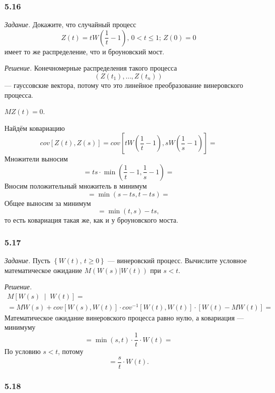 \subsubsection*{5.16}

\textit{Задание.}
Докажите, что случайный процесс
$$Z \left( t \right) = tW \left( \frac{1}{t} - 1 \right), \,
  0 < t \leq 1; \,
  Z \left( 0 \right) = 0$$
имеет то же распределение, что и броуновский мост.

\textit{Решение.}
Конечномерные распределения такого процесса
$$ \left( Z \left( t_1 \right), \dotsc, Z \left( t_n \right) \right) $$
--- гауссовские вектора,
потому что это линейное преобразование винеровского процесса.

$MZ \left( t \right) =
  0$.

Найдём ковариацию
$$cov \left[ Z \left( t \right), Z \left( s \right) \right] =
  cov \left[ tW \left( \frac{1}{t} - 1 \right), sW \left( \frac{1}{s} - 1 \right) \right] =$$
Множители выносим
$$= ts \cdot \min \left( \frac{1}{t} - 1, \frac{1}{s} - 1 \right) =$$
Вносим положительный множитель в минимум
$$= \min \left( s - ts, t - ts \right) =$$
Общее выносим за минимум
$$= \min \left( t, s \right) - ts,$$
то есть ковариация такая же, как и у броуновского моста.


\subsubsection*{5.17}

\textit{Задание.}
Пусть $ \left\{ W \left( t \right), \, t \geq 0 \right\} $ --- винеровский процесс.
Вычислите условное математическое ожидание
$M \left( \left. W \left( s \right) \right| W \left( t \right) \right) $ при $s < t$.

\textit{Решение.}
\begin{gather*}
  M \left[ W \left( s \right) \; \middle| \; W \left( t \right) \right] = \\
  = MW \left( s \right) +
  cov \left[ W \left( s \right), W \left( t \right) \right] \cdot
  cov^{-1} \left[ W \left( t \right), W \left( t \right) \right] \cdot
  \left[ W \left( t \right) - MW \left( t \right) \right]=
\end{gather*}
Математическое ожидание винеровского процесса равно нулю, а ковариация --- минимуму
$$= \min \left( s, t \right) \cdot \frac{1}{t} \cdot W \left( t \right) =$$
По условию $s < t$, потому
$$= \frac{s}{t} \cdot W \left( t \right).$$

\subsubsection*{5.18}

